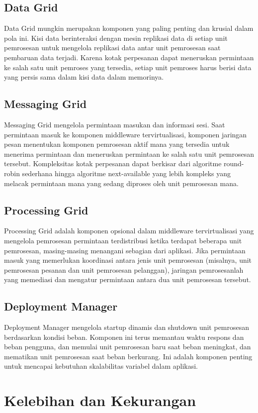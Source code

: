 	\subsection*{\LARGE{Data Grid}}
	\large Data Grid mungkin merupakan komponen yang paling penting dan krusial dalam pola ini. Kisi data berinteraksi dengan mesin replikasi data di setiap unit pemrosesan untuk mengelola replikasi data antar unit pemrosesan saat pembaruan data terjadi. Karena kotak perpesanan dapat meneruskan permintaan ke salah satu unit pemroses yang tersedia, setiap unit pemroses harus berisi data yang persis sama dalam kisi data dalam memorinya.
	\subsection*{\LARGE{Messaging Grid}}
	\large Messaging Grid mengelola permintaan masukan dan informasi sesi. Saat permintaan masuk ke komponen middleware tervirtualisasi, komponen jaringan pesan menentukan komponen pemrosesan aktif mana yang tersedia untuk menerima permintaan dan meneruskan permintaan ke salah satu unit pemrosesan tersebut. Kompleksitas kotak perpesanan dapat berkisar dari algoritme round-robin sederhana hingga algoritme next-available yang lebih kompleks yang melacak permintaan mana yang sedang diproses oleh unit pemrosesan mana.
	\subsection*{\LARGE{Processing Grid}}
	\large Processing Grid adalah komponen opsional dalam middleware tervirtualisasi yang mengelola pemrosesan permintaan terdistribusi ketika terdapat beberapa unit pemrosesan, masing-masing menangani sebagian dari aplikasi. Jika permintaan masuk yang memerlukan koordinasi antara jenis unit pemrosesan (misalnya, unit pemrosesan pesanan dan unit pemrosesan pelanggan), jaringan pemrosesanlah yang memediasi dan mengatur permintaan antara dua unit pemrosesan tersebut.
	\subsection*{\LARGE{Deployment Manager}}
	\large Deployment Manager mengelola startup dinamis dan shutdown unit pemrosesan berdasarkan kondisi beban. Komponen ini terus memantau waktu respons dan beban pengguna, dan memulai unit pemrosesan baru saat beban meningkat, dan mematikan unit pemrosesan saat beban berkurang. Ini adalah komponen penting untuk mencapai kebutuhan skalabilitas variabel dalam aplikasi.
	\section*{\huge{Kelebihan dan Kekurangan}}
